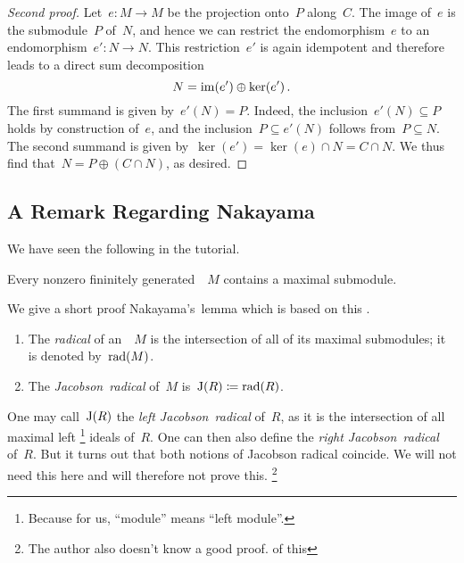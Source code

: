 \begin{proof}[Second proof]
  Let~$e \colon M \to M$ be the projection onto~$P$ along~$C$.
  The image of~$e$ is the submodule~$P$ of~$N$, and hence we can restrict the endomorphism~$e$ to an endomorphism~$e' \colon N \to N$.
  This restriction~$e'$ is again idempotent and therefore leads to a direct sum decomposition
  \[
      N
    = \operatorname{im}(e') \oplus \ker(e') \,.
  \]
  The first summand is given by~$e'(N) = P$.
  Indeed, the inclusion~$e'(N) \subseteq P$ holds by construction of~$e$, and the inclusion~$P \subseteq e'(N)$ follows from~$P \subseteq N$.
  The second summand is given by~$\ker(e') = \ker(e) \cap N = C \cap N$.
  We thus find that~$N = P \oplus (C \cap N)$, as desired.
\end{proof}





\subsection*{A Remark Regarding Nakayama}

We have seen the following  in the tutorial.

\begin{lemma}
  \label{fg has maximal submodules}
  Every nonzero fininitely generated~{}~$M$ contains a maximal submodule.
\end{lemma}

We give a short proof Nakayama’s~lemma which is based on this .

\begin{definition}
  \leavevmode
  \begin{enumerate}
    \item
      The \emph{radical} of an~{}~$M$ is the intersection of all of its maximal submodules;
      it is denoted by~$\operatorname{rad}(M)$.
    \item
      The \emph{Jacobson~radical} of~$M$ is~$\operatorname{J}(R) \coloneqq \operatorname{rad}(R)$.
  \end{enumerate}
\end{definition}

\begin{remark}
  One may call~$\operatorname{J}(R)$ the \emph{left Jacobson~radical} of~$R$, as it is the intersection of all maximal left%
  \footnote{Because for us, \enquote{module} means \enquote{left module}.}
  ideals of~$R$.
  One can then also define the \emph{right Jacobson~radical} of~$R$.
  But it turns out that both notions of Jacobson radical coincide.
  We will not need this here and will therefore not prove this.%
  \footnote{The author also doesn’t know a good proof. of this}
\end{remark}

